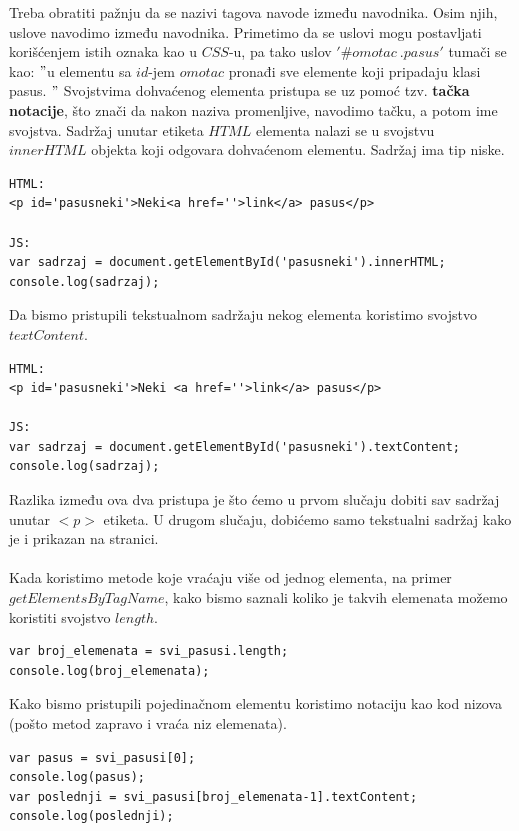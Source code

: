 Treba obratiti pažnju da se nazivi tagova navode između navodnika. Osim njih, uslove navodimo između navodnika. Primetimo da se uslovi mogu postavljati korišćenjem istih oznaka kao u $CSS$-u, pa tako uslov $'\#omotac\ .pasus'$ tumači se kao: $"$u elementu sa $id$-jem $omotac$ pronađi sve elemente koji pripadaju klasi pasus. $"$
Svojstvima dohvaćenog elementa pristupa se uz pomoć tzv. \textbf{tačka notacije}, što znači da nakon naziva promenljive, navodimo tačku, a potom ime svojstva. Sadržaj unutar etiketa $HTML$ elementa nalazi se u svojstvu $innerHTML$ objekta koji odgovara dohvaćenom elementu. Sadržaj ima tip niske.
\begin{lstlisting}[backgroundcolor = \color{lightgray}, breaklines=true]
HTML:
<p id='pasusneki'>Neki<a href=''>link</a> pasus</p>

JS:
var sadrzaj = document.getElementById('pasusneki').innerHTML;
console.log(sadrzaj);
\end{lstlisting} 	 
Da bismo pristupili tekstualnom sadržaju nekog elementa koristimo svojstvo $textContent$.
\begin{lstlisting}[backgroundcolor = \color{lightgray}, breaklines=true]
HTML:
<p id='pasusneki'>Neki <a href=''>link</a> pasus</p>

JS:
var sadrzaj = document.getElementById('pasusneki').textContent;
console.log(sadrzaj);
\end{lstlisting}

Razlika između ova dva pristupa je što ćemo u prvom slučaju dobiti sav sadržaj unutar $<p>$ etiketa. U drugom slučaju, dobićemo samo tekstualni sadržaj kako je i prikazan na stranici. \\\\
Kada koristimo metode koje vraćaju više od jednog elementa, na primer $getElementsByTagName$, kako bismo saznali koliko je takvih elemenata možemo koristiti svojstvo $length$.
\begin{lstlisting}[backgroundcolor = \color{lightgray}, breaklines=true]
var broj_elemenata = svi_pasusi.length;
console.log(broj_elemenata);
\end{lstlisting}
Kako bismo pristupili pojedinačnom elementu koristimo notaciju kao kod nizova (pošto metod zapravo i vraća niz elemenata).
\begin{lstlisting}[backgroundcolor = \color{lightgray}, breaklines=true]
var pasus = svi_pasusi[0];
console.log(pasus);
var poslednji = svi_pasusi[broj_elemenata-1].textContent;
console.log(poslednji);
\end{lstlisting}

